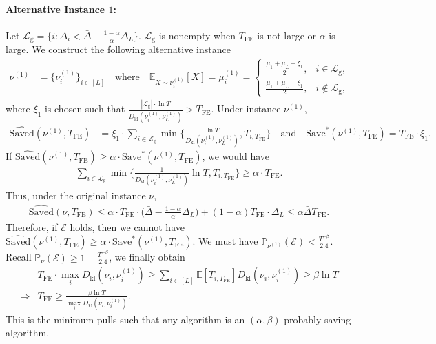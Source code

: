 \documentclass[twoside,11pt]{article}
\newcommand{\kl}{D_{\mathrm{kl}}}
\newcommand{\calE}{\mathcal{E}}
\newcommand{\calL}{\mathcal{L}}
\newcommand{\rmg}{\mathrm{g}}
\newcommand{\bbE}{\mathbb{E}}
\newcommand{\bbP}{\mathbb{P}}
\newcommand{\Tfe}{T_{\mathrm{FE}}}
\newcommand{\Saved}{\mathrm{Save}}
\newcommand{\whatSaved}{\widehat{\mathrm{Saved}}}
\newcommand{\barDelta}{\bar{\Delta}}
\begin{document}
\paragraph{Alternative Instance $1$:} Let $\calL_{\rmg} = \{i:\Delta_i<\barDelta-\frac{1-\alpha}{\alpha}\Delta_L\}$. $\calL_{\rmg}$ is nonempty when $\Tfe$ is not large or $\alpha$ is large.
We construct the following alternative instance
\begin{align}
\nu^{(1)} 
&= \big\{ \nu_i^{(1)} \big\}_{i\in[L]} 
\quad\text{where}\quad \bbE_{X\sim \nu_i^{(1)}}[X]=
\mu_i^{(1)} =
\begin{cases}
\frac{\mu_1+\mu_L-\xi_1}{2}, & i\in\calL_{\rmg}, \\
\frac{\mu_1+\mu_L+\xi_1}{2}, & i\notin\calL_{\rmg},
\end{cases}
\end{align}
where $\xi_1$ is chosen such that $\frac{|\calL_{\rmg}|\cdot \ln T}{\kl(\nu_i^{(1)},\nu_{L}^{(1)})} >\Tfe$.
Under instance $\nu^{(1)}$,
\begin{align}
    \whatSaved(\nu^{(1)},\Tfe) &= 
    \xi_1\cdot \sum_{i\in\calL_{\rmg}} \min\bigg\{\frac{\ln T}{\kl(\nu_i^{(1)},\nu_{L}^{(1)})}, T_{i,\Tfe}\bigg\}
    \quad\mbox{and}\quad
     \Saved^*(\nu^{(1)},\Tfe) = \Tfe\cdot\xi_1.
\end{align}
If $\whatSaved(\nu^{(1)},\Tfe)\geq \alpha\cdot \Saved^*(\nu^{(1)},\Tfe)$, we would have
\begin{align}
    \sum_{i\in\calL_{\rmg}} \min\bigg\{\frac{1}{\kl(\nu_i^{(1)},\nu_{L}^{(1)})}\ln T, T_{i,\Tfe}\bigg\}\geq \alpha\cdot \Tfe.
\end{align}
Thus, under the original instance $\nu$, 
\begin{align}
    \whatSaved(\nu,\Tfe) \leq
    \alpha\cdot \Tfe\cdot \bigg(\barDelta-\frac{1-\alpha}{\alpha}\Delta_L\bigg)+(1-\alpha)\Tfe\cdot \Delta_L
    \leq \alpha\barDelta\Tfe.
\end{align}
Therefore, if $\calE$ holds, then we cannot have $\whatSaved(\nu^{(1)},\Tfe)\geq \alpha\cdot \Saved^*(\nu^{(1)},\Tfe)$. We must have $\bbP_{\nu^{(1)}}(\calE)<\frac{T^{-\beta}}{2.4}$. 
Recall $\bbP_{\nu}(\calE)\geq 1 - \frac{T^{-\beta}}{2.4}$,
we finally obtain
\begin{align}
    &\Tfe\cdot \max_i \kl(\nu_i,\nu_i^{(1)})
    \geq 
    \sum_{i\in[L]}\bbE[T_{i,\Tfe}] \kl(\nu_i,\nu_i^{(1)})
    \geq
    \beta\ln T
    \\
    \Rightarrow
    &
    \Tfe\geq \frac{\beta\ln T}{\max_i \kl(\nu_i,\nu_i^{(1)}) }.
\end{align}
This is the minimum pulls such that any algorithm is an $(\alpha,\beta)$-probably saving algorithm.
\end{document}

